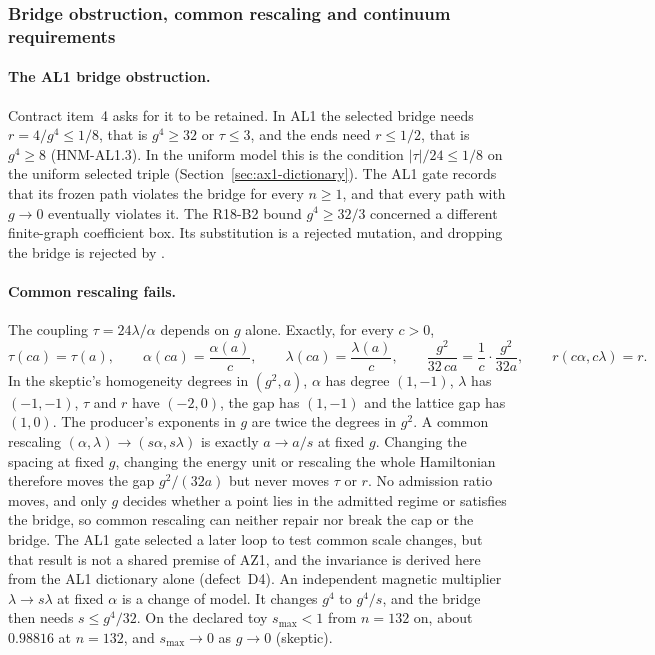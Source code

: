 \subsubsection{Bridge obstruction, common rescaling and continuum requirements}
\label{sec:az1-requirements}
\paragraph{The AL1 bridge obstruction.}
Contract item~4 asks for it to be retained. In AL1 the selected bridge needs
$r=4/g^4\le1/8$, that is $g^4\ge32$ or $\tau\le3$, and the ends need
$r\le1/2$, that is $g^4\ge8$ (HNM-AL1.3). In the uniform model this is the
condition $|\tau|/24\le1/8$ on the uniform selected triple
(Section~\ref{sec:ax1-dictionary}). The AL1 gate records that its frozen path
violates the bridge for every $n\ge1$, and that every path with $g\to0$
eventually violates it. The R18-B2 bound $g^4\ge32/3$ concerned a different
finite-graph coefficient box. Its substitution is a rejected mutation, and
dropping the bridge is rejected by .

\paragraph{Common rescaling fails.}
The coupling $\tau=24\lambda/\alpha$ depends on $g$ alone. Exactly, for every
$c>0$,
\begin{equation}
 \tau(ca)=\tau(a),\qquad \alpha(ca)=\frac{\alpha(a)}c,\qquad
 \lambda(ca)=\frac{\lambda(a)}c,\qquad
 \frac{g^2}{32\,ca}=\frac1c\cdot\frac{g^2}{32a},\qquad
 r(c\alpha,c\lambda)=r .
 \label{eq:az1-rescaling}
\end{equation}
In the skeptic's homogeneity degrees in $(g^2,a)$, $\alpha$ has degree
$(1,-1)$, $\lambda$ has $(-1,-1)$, $\tau$ and $r$ have $(-2,0)$, the gap has
$(1,-1)$ and the lattice gap has $(1,0)$. The producer's exponents in $g$ are
twice the degrees in $g^2$. A common rescaling
$(\alpha,\lambda)\to(s\alpha,s\lambda)$ is exactly $a\to a/s$ at fixed $g$.
Changing the spacing at fixed $g$, changing the energy unit or rescaling the
whole Hamiltonian therefore moves the gap $g^2/(32a)$ but never moves $\tau$
or $r$. No admission ratio moves, and only $g$ decides whether a point lies in
the admitted regime or satisfies the bridge, so common rescaling can neither
repair nor break the cap or the bridge. The AL1 gate selected a later loop to
test common scale changes, but that result is not a shared premise of AZ1,
and the invariance is derived here from the AL1 dictionary alone
(defect~D4). An independent magnetic multiplier $\lambda\to s\lambda$ at fixed
$\alpha$ is a change of model. It changes $g^4$ to $g^4/s$, and the bridge
then needs $s\le g^4/32$. On the declared toy $s_{\max}<1$ from $n=132$ on,
about $0.98816$ at $n=132$, and $s_{\max}\to0$ as $g\to0$ (skeptic).

